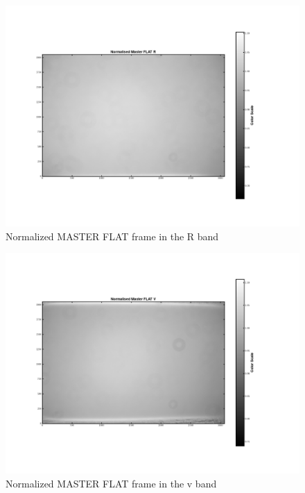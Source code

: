 \documentclass[12pt]{article}
\begin{document}
    \begin{figure}[H]
    \centering
    \includegraphics[width=\textwidth]{fig/Normal_Master_FLAT_R.png}
    \caption{Normalized MASTER FLAT frame in the R band}

    \end{figure}

    \begin{figure}[H]
    \centering
    \includegraphics[width=\textwidth]{fig/Normal_Master_FLAT_V.png}
    \caption{Normalized MASTER FLAT frame in the v band}

    \end{figure}
\end{document}
